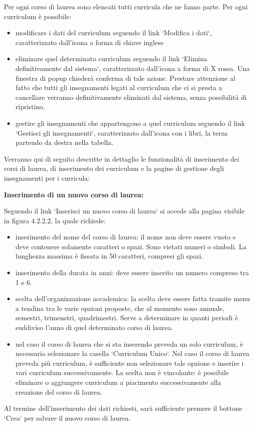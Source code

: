 \documentclass[11pt,a4paper]{article}
\begin{document}
Per ogni corso di laurea sono elencati tutti curricula che ne fanno parte.
Per ogni curriculum è possibile:
\begin{itemize}
 \item modificare i dati del curriculum seguendo il link `Modifica i dati`, caratterizzato dall'icona a forma di chiave inglese
 \item eliminare quel determinato curriculum seguendo il link `Elimina definitivamente dal sistema`, caratterizzato dall'icona a forma di X rossa. Una finestra di popup chiederà conferma di tale azione. Prestare attenzione al fatto che tutti gli insegnamenti legati al curriculum che ci si presta a cancellare verranno definitivamente eliminati dal sistema, senza possibilità di ripristino.
 \item gestire gli insegnamenti che appartengono a quel curriculum seguendo il link `Gestisci gli insegnamenti`, caratterizzato dall'icona con i libri, la terza partendo da destra nella tabella.
\end{itemize}

Verranno qui di seguito descritte in dettaglio le funzionalità di inserimento dei corsi di laurea, di inserimento dei curriculum e la pagine di gestione degli insegnamenti per i curricula:
\newline \newline \newline
\begin{large}\textbf{Inserimento di un nuovo corso di laurea:}\end{large}
\newline \newline
Seguendo il link `Inserisci un nuovo corso di laurea` si accede alla pagina visibile in figura 4.2.2.2, la quale richiede:
\begin{itemize}
 \item inserimento del nome del corso di laurea: il nome non deve essere vuoto e deve contenere solamente caratteri o spazi. Sono vietati numeri o simboli. La lunghezza massima è fissata in 50 caratteri, compresi gli spazi.
 \item inserimento della durata in anni: deve essere inserito un numero compreso tra 1 e 6.
 \item scelta dell'organizzazione accademica: la scelta deve essere fatta tramite menu a tendina tra le varie opzioni proposte, che al momento sono annuale, semestri, trimenstri, quadrimestri. Serve a determinare in quanti periodi è suddiviso l'anno di quel determinato corso di laurea.
 \item nel caso il corso di laurea che si sta inserendo preveda un solo curriculum, è necessario selezionare la casella `Curriculum Unico`. Nel caso il corso di laurea preveda più curriculum, è sufficiente non selezionare tale opzione e inserire i vari curriculum successivamente. La scelta non è vincolante: è possibile eliminare o aggiungere curriculum a piacimento successivamente alla creazione del corso di laurea.
\end{itemize}
Al termine dell'inserimento dei dati richiesti, sarà sufficiente premere il bottone `Crea` per salvare il nuovo corso di laurea.
\end{document}
